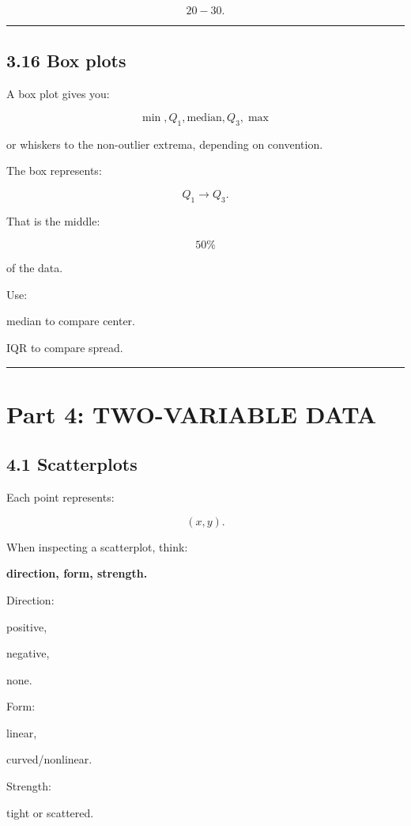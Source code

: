 \documentclass[
]{article}
\newcounter{none} %
\begin{document}
\[
\boxed{20-30}.
\]

\begin{center}\rule{0.5\linewidth}{0.5pt}\end{center}

\subsection{3.16 Box plots}\label{box-plots}

A box plot gives you:

\[
\boxed{\min,Q_1,\text{median},Q_3,\max}
\]

or whiskers to the non-outlier extrema, depending on convention.

The box represents:

\[
Q_1\rightarrow Q_3.
\]

That is the middle:

\[
\boxed{50\%}
\]

of the data.

Use:

median to compare center.

IQR to compare spread.

\begin{center}\rule{0.5\linewidth}{0.5pt}\end{center}

\section{Part 4: TWO-VARIABLE DATA}\label{part-4-two-variable-data}

\subsection{4.1 Scatterplots}\label{scatterplots}

Each point represents:

\[
(x,y).
\]

When inspecting a scatterplot, think:

\textbf{direction, form, strength.}

Direction:

positive,

negative,

none.

Form:

linear,

curved/nonlinear.

Strength:

tight or scattered.
\end{document}
